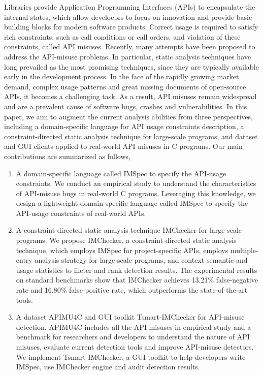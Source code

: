\begin{eabstract}
   Libraries provide Application Programming Interfaces (APIs) to encapsulate the internal states, 
   which allow develoeprs to focus on innovation and provide basic building blocks for modern software products.
   Correct usage is required to satisfy rich constraints, such as call conditions or call orders, and violation of these constraints, called API misuses.
   Recently, many attempts have been proposed to address the API-misuse problems. 
   In particular, static analysis techniques have long prevailed as the most promising techniques, since they are typically available early in the development process.
   In the face of the rapidly growing market demand, complex usage patterns and great missing documents of open-source APIs, 
   it becomes a challenging task.
   As a result, API misuses remain widespread and are a prevalent cause of software bugs, crashes and vulnerabilities.
   In this paper, we aim to augment the current analysis abilities from three perspectives, including a domain-specific language for API usage constraints description, 
   a constraint-directed static analysis technique for large-scale programs,
   and dataset and GUI clients applied to real-world API misuses in C programs.
   Our main contributions are summarized as follows,
   \begin{enumerate}
   	\item A domain-specific language called IMSpec to specify the API-usage constraints.
   	We conduct an empirical study to understand the characteristics
   	of API-misuse bugs in real-world C programs.
   	Leveraging this knowledge, we design a lightweight domain-specific language called IMSpec to specify the API-usage constraints of real-world APIs.
   	\item A constraint-directed static analysis technique IMChecker for large-scale programs.
   	We propose IMChecker, a constraint-directed static analysis technique, which employs IMSpec for project-specific APIs, employs multiple-entry analysis strategy for large-scale programs, and context semantic and usage statistics to fileter and rank detection results.
   	The experimental results on standard benchmarks show that IMChecker achieves 13.21\% false-negative rate and 16.80\% false-positive rate, 
   	which outperforms the state-of-the-art tools.
   	\item A dataset APIMU4C and GUI toolkit Tsmart-IMChecker for API-misuse detection.
   	APIMU4C includes all the API misuses in empirical study and a benchmark for researchers and developers to understand the nature of API misuses, evaluate current detection tools and improve API-misuse detectors.
   	We implement Tsmart-IMChecker, a GUI toolkit to help developers write IMSpec, use IMChecker engine and audit detection results.
   \end{enumerate}


\end{eabstract}
